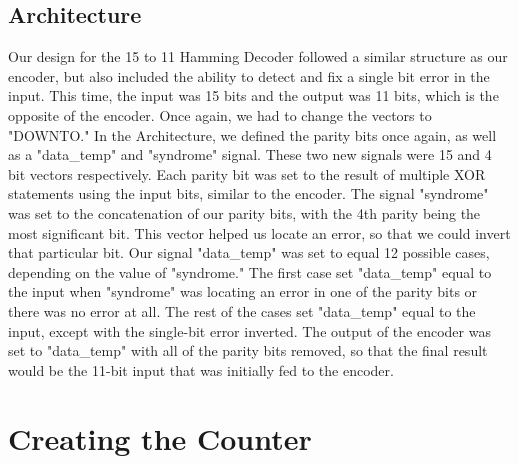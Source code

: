 \documentclass[paper=letter, fontsize=11pt]{scrartcl}
\numberwithin{equation}{section} %
\numberwithin{figure}{section} %
\numberwithin{table}{section} %
\begin{document}
\subsection{Architecture}
\begin{flushleft}
	Our design for the 15 to 11 Hamming Decoder followed a similar structure as our encoder, but also included the ability to detect and fix a single bit error in the input. This time, the input was 15 bits and the output was 11 bits, which is the opposite of the encoder. Once again, we had to change the vectors to "DOWNTO." In the Architecture, we defined the parity bits once again, as well as a "data\_temp" and "syndrome" signal. These two new signals were 15 and 4 bit vectors respectively. Each parity bit was set to the result of multiple XOR statements using the input bits, similar to the encoder. The signal "syndrome" was set to the concatenation of our parity bits, with the 4th parity being the most significant bit. This vector helped us locate an error, so that we could invert that particular bit. Our signal "data\_temp" was set to equal 12 possible cases, depending on the value of "syndrome." The first case set "data\_temp" equal to the input when "syndrome" was locating an error in one of the parity bits or there was no error at all. The rest of the cases set "data\_temp" equal to the input, except with the single-bit error inverted. The output of the encoder was set to "data\_temp" with all of the parity bits removed, so that the final result would be the 11-bit input that was initially fed to the encoder. \\[20pt]      
\end{flushleft}

\section{Creating the Counter}
\end{document}
